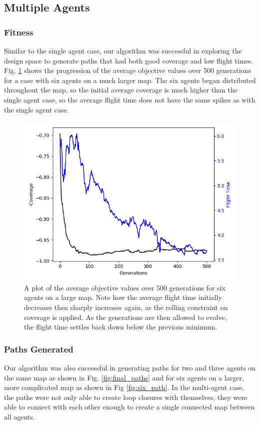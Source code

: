 \documentclass[letterpaper, 10 pt, conference]{ieeeconf}  %
\begin{document}
\subsection{Multiple Agents}
\subsubsection{Fitness}
Similar to the single agent case, our algorithm was successful in exploring the design space to generate paths that had both good coverage and low flight times. Fig. \ref{fig:multi_fitness} shows the progression of the average objective values over 500 generations for a case with six agents on a much larger map. The six agents began distributed throughout the map, so the initial average coverage is much higher than the single agent case, so the average flight time does not have the same spikes as with the single agent case.

\begin{figure}
\centering
\includegraphics[width=1.0\linewidth]{multi_agent_pareto_hist.png}
\caption[A plot of average objective values over generations for six agents in coverage planning optimization.]{A plot of the average objective values over 500 generations for six agents on a large map. Note how the average flight time initially decreases then sharply increases again, as the rolling constraint on coverage is applied. As the generations are then allowed to evolve, the flight time settles back down below the previous minimum.}
\label{fig:multi_fitness}
\end{figure}

\subsubsection{Paths Generated}
Our algorithm was also successful in generating paths for two and three agents on the same map as shown in Fig. \ref{fig:final_paths} and for six agents on a larger, more complicated map as shown in Fig \ref{fig:six_path}. In the multi-agent case, the paths were not only able to create loop closures with themselves, they were able to connect with each other enough to create a single connected map between all agents.
\end{document}
